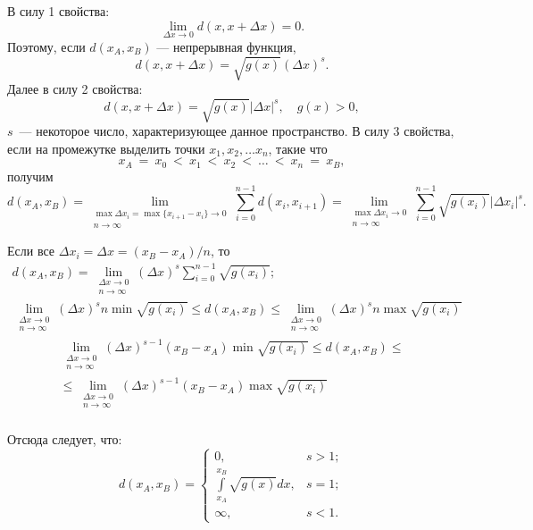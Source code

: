 \documentclass[a4paper,14pt]{extreport} %
\begin{document}
	В силу 1 свойства:
	\[
		\lim\limits_{\Delta x \rightarrow 0} d(x, x + \Delta x) = 0.
	\]
	Поэтому, если $d(x_A, x_B)$ --- непрерывная функция,
	\[
		d(x, x + \Delta x) = \sqrt{g(x)} (\Delta x)^s.
	\]	
	Далее в силу 2 свойства:
	\[
		d(x, x + \Delta x) = \sqrt{g(x)} |\Delta x|^s, \quad g(x) > 0,
	\]
	$s$~--- некоторое число, характеризующее данное пространство. В силу 3 свойства, если на промежутке выделить точки $x_1, x_2, \ldots x_n$, такие что
	\[
		x_A~=~x_0~<~x_1~<~x_2~<~\ldots~<~x_n~=~x_B,
	\]
	получим
	\[
		d(x_A, x_B) = 
		\lim\limits_{\substack{\max \Delta x_i = \max \{x_{i+1} - x_i\} \to 0 \\ n \to \infty}} \sum\limits_{i = 0}^{n-1} d(x_i, x_{i+1}) =
		\lim\limits_{\substack{\max \Delta x_i \to 0 \\ n \to \infty}} \sum\limits_{i = 0}^{n-1} \sqrt{g(x_i)} |\Delta x_i|^s.
	\]
	
	Если все $\Delta x_i = \Delta x = (x_B - x_A)/n$, то 
	\begin{equation*}
		\begin{gathered}
			d(x_A, x_B) =  \lim\limits_{\substack{\Delta x\to 0 \\ n \to \infty}} (\Delta x)^s \sum\limits_{i = 0}^{n-1} \sqrt{g(x_i)}; \\
			\lim\limits_{\substack{\Delta x \to 0 \\ n \to \infty}} (\Delta x)^s n \min \sqrt{g(x_i)} \leqslant
			d(x_A, x_B) \leqslant
			\lim\limits_{\substack{\Delta x \to 0 \\ n \to \infty}} (\Delta x)^s n \max \sqrt{g(x_i)}
		\end{gathered}
	\end{equation*}
	\begin{equation*}
		\begin{gathered}
			\lim\limits_{\substack{\Delta x \to 0 \\ n \to \infty}} (\Delta x)^{s-1} (x_B - x_A) \min \sqrt{g(x_i)} \leqslant
			d(x_A, x_B) \leqslant \\ \leqslant
			\lim\limits_{\substack{\Delta x \to 0 \\ n \to \infty}} (\Delta x)^{s-1} (x_B - x_A) \max \sqrt{g(x_i)} \\
		\end{gathered}
	\end{equation*}
	
	Отсюда следует, что:
	\[
		d(x_A, x_B) =
		\begin{cases}
			0, & s>1; \\
			\int\limits_{x_A}^{x_B} \sqrt{g(x)} dx, & s = 1; \\
			\infty, &  s<1.
		\end{cases}
	\]
	
\end{document}
